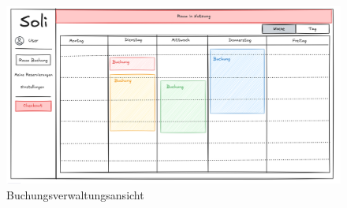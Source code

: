 \begin{figure}[ht]
    
    \includegraphics[scale=0.15]{figures/checkout.png}
    \caption{Buchungsverwaltungsansicht}
    \label{fig:fklsj}
\end{figure}
